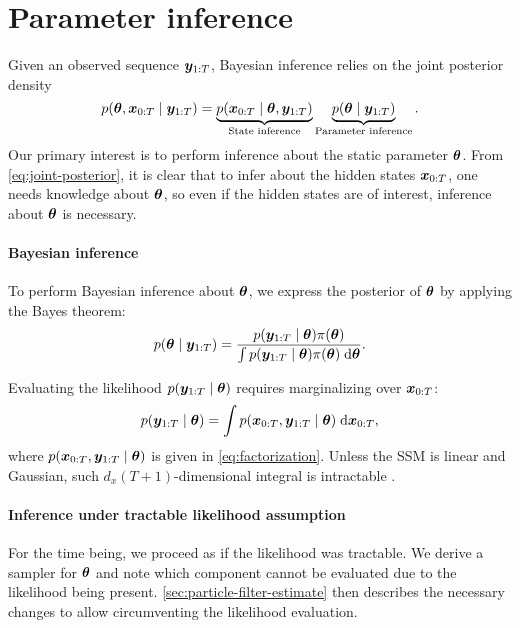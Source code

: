\section{Parameter inference} \label{sec:parameter-inference}
Given an observed sequence $\bm{y}_{1:T}$, Bayesian inference relies on the joint posterior density
\begin{equation}\label{eq:joint-posterior}
p(\bm{\theta}, \bm{x}_{0:T} \mid \bm{y}_{1:T}) = \underbrace{p(\bm{x}_{0:T} \mid \bm{\theta}, \bm{y}_{1:T})}_{\text{State inference}} \underbrace{p(\bm{\theta} \mid \bm{y}_{1:T})}_{\text{Parameter inference}}.
\end{equation}
Our primary interest is to perform inference about the static parameter $\bm{\theta}$. From \eqref{eq:joint-posterior}, it is clear that to infer about the hidden states $\bm{x}_{0:T}$, one needs knowledge about $\bm{\theta}$, so even if the hidden states are of interest, inference about $\bm{\theta}$ is necessary.


\paragraph{Bayesian inference}

To perform Bayesian inference about $\bm{\theta}$, we express the posterior of $\bm{\theta}$ by applying the Bayes theorem:
\begin{equation} \label{eq:posterior}
p(\bm{\theta} \mid \bm{y}_{1:T}) = \frac{p(\bm{y}_{1:T} \mid \bm{\theta}) \pi(\bm{\theta})}{\int p(\bm{y}_{1:T} \mid \bm{\theta}) \pi(\bm{\theta}) \; \mathrm{d}{\bm{\theta}}}.
\end{equation}

Evaluating the likelihood $p(\bm{y}_{1:T} \mid \bm{\theta})$ requires marginalizing over $\bm{x}_{0:T}$:
\begin{equation*}
p(\bm{y}_{1:T} \mid \bm{\theta}) = \int p(\bm{x}_{0:T}, \bm{y}_{1:T} \mid \bm{\theta}) \; \mathrm{d}{\bm{x}_{0:T}},
\end{equation*}
where $p(\bm{x}_{0:T}, \bm{y}_{1:T} \mid \bm{\theta})$ is given in \eqref{eq:factorization}. Unless the SSM is linear and Gaussian, such $d_x(T+1)$-dimensional integral is intractable \citep{andrieu}.


\paragraph{Inference under tractable likelihood assumption}

For the time being, we proceed as if the likelihood was tractable. We derive a sampler for $\bm{\theta}$ and note which component cannot be evaluated due to the likelihood being present. \autoref{sec:particle-filter-estimate} then describes the necessary changes to allow circumventing the likelihood evaluation.


